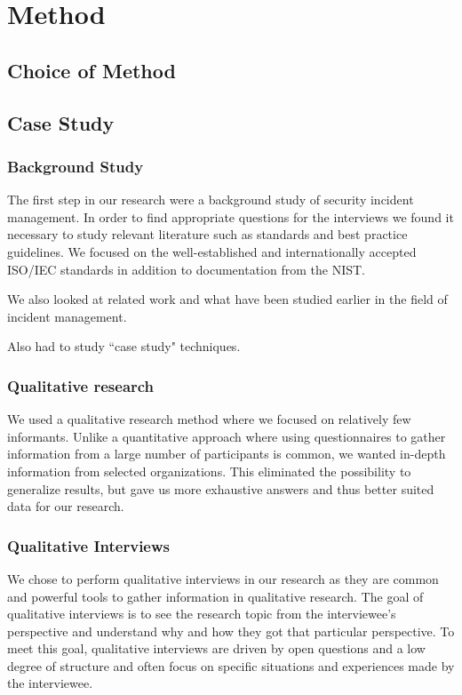 \chapter{Method}
\section{Choice of Method}


\section{Case Study}


\subsection{Background Study}
\label{sec:background}
The first step in our research were a background study of security incident management. In order to find appropriate questions for the interviews we found it necessary to study relevant literature such as standards and best practice guidelines. We focused on the well-established and internationally accepted ISO/IEC standards in addition to documentation from the \ac{NIST}.

We also looked at related work and what have been studied earlier in the field of incident management. 

Also had to study ``case study" techniques.

\subsection{Qualitative research}
We used a qualitative research method where we focused on relatively few informants. Unlike a quantitative approach where using questionnaires to gather information from a large number of participants is common, we wanted in-depth information from selected organizations. This eliminated the possibility to generalize results, but gave us more exhaustive answers and thus better suited data for our research.

\subsection{Qualitative Interviews}
\label{sec:interviews}
We chose to perform qualitative interviews in our research as they are common and powerful tools to gather information in qualitative research\cite{myers2007qualitative}. The goal of qualitative interviews is to see the research topic from the interviewee's perspective and understand why and how they got that particular perspective\cite{cassell2004essential}. To meet this goal, qualitative interviews are driven by open questions and a low degree of structure and often focus on specific situations and experiences made by the interviewee. 

